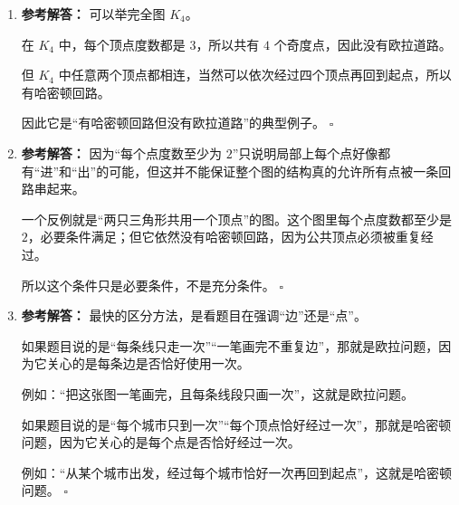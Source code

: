 \documentclass[11pt,a4paper,fontset=fandol]{ctexart}
\newenvironment{solution}{\par\noindent\textbf{参考解答：}}{\hfill$\square$\par}
\begin{document}
\begin{enumerate}
\begin{solution}
  因此它是“有欧拉回路但没有哈密顿回路”的典型例子。
  \end{solution}

  \item \begin{solution}
  可以举完全图 $K_4$。

  在 $K_4$ 中，每个顶点度数都是 $3$，所以共有 $4$ 个奇度点，因此没有欧拉道路。

  但 $K_4$ 中任意两个顶点都相连，当然可以依次经过四个顶点再回到起点，所以有哈密顿回路。

  因此它是“有哈密顿回路但没有欧拉道路”的典型例子。
  \end{solution}

  \item \begin{solution}
  因为“每个点度数至少为 $2$”只说明局部上每个点好像都有“进”和“出”的可能，但这并不能保证整个图的结构真的允许所有点被一条回路串起来。

  一个反例就是“两只三角形共用一个顶点”的图。这个图里每个点度数都至少是 $2$，必要条件满足；但它依然没有哈密顿回路，因为公共顶点必须被重复经过。

  所以这个条件只是必要条件，不是充分条件。
  \end{solution}

  \item \begin{solution}
  最快的区分方法，是看题目在强调“边”还是“点”。

  如果题目说的是“每条线只走一次”“一笔画完不重复边”，那就是欧拉问题，因为它关心的是每条边是否恰好使用一次。

  例如：“把这张图一笔画完，且每条线段只画一次”，这就是欧拉问题。

  如果题目说的是“每个城市只到一次”“每个顶点恰好经过一次”，那就是哈密顿问题，因为它关心的是每个点是否恰好经过一次。

  例如：“从某个城市出发，经过每个城市恰好一次再回到起点”，这就是哈密顿问题。
  \end{solution}
\end{enumerate}
\end{document}
